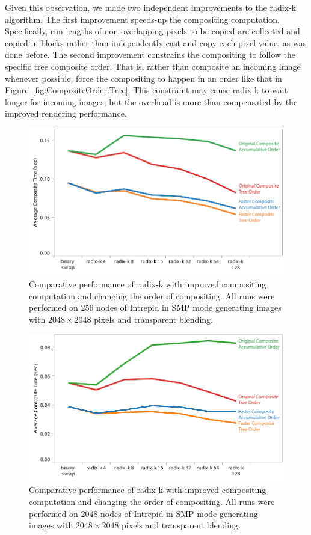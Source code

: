\documentclass{acm_proc_article-sp}
\begin{document}
Given this observation, we made two independent improvements to the radix-k
algorithm.  The first improvement speeds-up the compositing computation.
Specifically, run lengths of non-overlapping pixels to be copied are
collected and copied in blocks rather than independently cast and copy each
pixel value, as was done before.  The second improvement constrains the
compositing to follow the specific tree composite order.  That is, rather
than composite an incoming image whenever possible, force the compositing
to happen in an order like that in Figure~\ref{fig:CompositeOrder:Tree}.
This constraint may cause radix-k to wait longer for incoming images, but
the overhead is more than compensated by the improved rendering
performance.

\begin{figure}[htbp]
  \centering
  \includegraphics[width=\linewidth]{images/CompositeImprovements0256}
  \caption{Comparative performance of radix-k with improved compositing
    computation and changing the order of compositing.  All runs were
    performed on 256 nodes of Intrepid in SMP mode generating images with
    $2048 \times 2048$ pixels and transparent blending.}
  \label{fig:IceTCompositeImprovements0256}
\end{figure}

\begin{figure}[htbp]
  \centering
  \includegraphics[width=\linewidth]{images/CompositeImprovements2048}
  \caption{Comparative performance of radix-k with improved compositing
    computation and changing the order of compositing.  All runs were
    performed on 2048 nodes of Intrepid in SMP mode generating images with
    $2048 \times 2048$ pixels and transparent blending.}
  \label{fig:IceTCompositeImprovements2048}
\end{figure}
\end{document}
